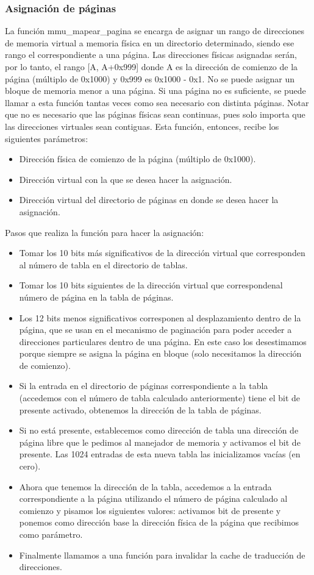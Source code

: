 \subsubsection{Asignación de páginas}
La función mmu\_mapear\_pagina se encarga de asignar un rango de direcciones de memoria virtual a memoria física en un directorio determinado, siendo ese rango el correspondiente a una página. Las direcciones físicas asignadas serán, por lo tanto, el rango [A, A+0x999] donde A es la dirección de comienzo de la página (múltiplo de 0x1000) y 0x999 es 0x1000 - 0x1. No se puede asignar un bloque de memoria menor a una página. Si una página no es suficiente, se puede llamar a esta función tantas veces como sea necesario con distinta páginas. Notar que no es necesario que las páginas físicas sean continuas, pues solo importa que las direcciones virtuales sean contiguas.\newline 
Esta función, entonces, recibe los siguientes parámetros:
\begin{itemize}
\item Dirección física de comienzo de la página (múltiplo de 0x1000).
\item Dirección virtual con la que se desea hacer la asignación.
\item Dirección virtual del directorio de páginas en donde se desea hacer la asignación.
\end{itemize}
Pasos que realiza la función para hacer la asignación:
\begin{itemize}
\item Tomar los 10 bits más significativos de la dirección virtual que corresponden al número de tabla en el directorio de tablas.
\item Tomar los 10 bits siguientes de la dirección virtual que correspondenal número de página en la tabla de páginas.
\item Los 12 bits menos significativos corresponen al desplazamiento dentro de la página, que se usan en el mecanismo de paginación para poder acceder a direcciones particulares dentro de una página. En este caso los desestimamos porque siempre se asigna la página en bloque (solo necesitamos la dirección de comienzo).
\item Si la entrada en el directorio de páginas correspondiente a la tabla (accedemos con el número de tabla calculado anteriormente) tiene el bit de presente activado, obtenemos la dirección de la tabla de páginas.
\item Si no está presente, establecemos como dirección de tabla una dirección de página libre que le pedimos al manejador de memoria y activamos el bit de presente. Las 1024 entradas de esta nueva tabla las inicializamos vacías (en cero).
\item Ahora que tenemos la dirección de la tabla, accedemos a la entrada correspondiente a la página utilizando el número de página calculado al comienzo y pisamos los siguientes valores: activamos bit de presente y ponemos como dirección base la dirección física de la página que recibimos como parámetro.
\item Finalmente llamamos a una función para invalidar la cache de traducción de direcciones.
\end{itemize}

